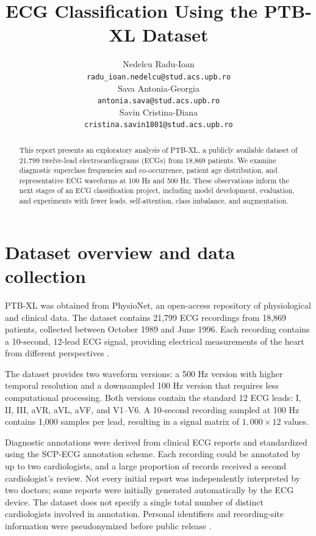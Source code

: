 \documentclass{article}
\title{ECG Classification Using the PTB-XL Dataset}
\author{%
  Nedelcu Radu-Ioan\\
  \texttt{radu\_ioan.nedelcu@stud.acs.upb.ro}\\[4pt]
  Sava Antonia-Georgia\\
  \texttt{antonia.sava@stud.acs.upb.ro}\\[4pt]
  Savin Cristina-Diana\\
  \texttt{cristina.savin1801@stud.acs.upb.ro}
}
\begin{document}
\maketitle

\begin{abstract}
This report presents an exploratory analysis of PTB-XL, a publicly available dataset of 21,799 twelve-lead electrocardiograms (ECGs) from 18,869 patients. We examine diagnostic superclass frequencies and co-occurrence, patient age distribution, and representative ECG waveforms at 100 Hz and 500 Hz. These observations inform the next stages of an ECG classification project, including model development, evaluation, and experiments with fewer leads, self-attention, class imbalance, and augmentation.
\end{abstract}

\section{Dataset overview and data collection}

PTB-XL was obtained from PhysioNet, an open-access repository of physiological and clinical data. The dataset contains 21,799 ECG recordings from 18,869 patients, collected between October 1989 and June 1996. Each recording contains a 10-second, 12-lead ECG signal, providing electrical measurements of the heart from different perspectives \citep{wagner2020}.

The dataset provides two waveform versions: a 500 Hz version with higher temporal resolution and a downsampled 100 Hz version that requires less computational processing. Both versions contain the standard 12 ECG leads: I, II, III, aVR, aVL, aVF, and V1--V6. A 10-second recording sampled at 100 Hz contains 1,000 samples per lead, resulting in a signal matrix of $1{,}000\times12$ values.

Diagnostic annotations were derived from clinical ECG reports and standardized using the SCP-ECG annotation scheme. Each recording could be annotated by up to two cardiologists, and a large proportion of records received a second cardiologist's review. Not every initial report was independently interpreted by two doctors; some reports were initially generated automatically by the ECG device. The dataset does not specify a single total number of distinct cardiologists involved in annotation. Personal identifiers and recording-site information were pseudonymized before public release \citep{wagner2020,physionet}.
\end{document}
